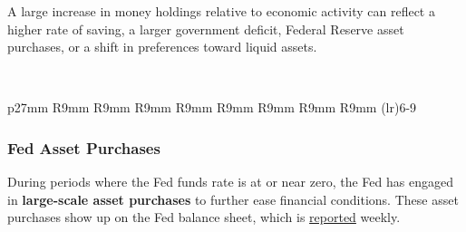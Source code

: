 \begin{minipage}{0.76\textwidth}
\small A large increase in money holdings relative to economic activity can reflect a higher rate of saving, a larger government deficit, Federal Reserve asset purchases, or a shift in preferences toward liquid assets.


\vspace{1mm}

\\
\vspace{4mm}

\vspace*{-3mm}

 \setlength{\tabcolsep}{3.5pt} \color{black!90}
{\renewcommand{\arraystretch}{1.65}
	\begin{tabular}{p{27mm} R{9mm} R{9mm} R{9mm} R{9mm} R{9mm} R{9mm} R{9mm} R{9mm}}
	\cmidrule(lr){6-9}\addlinespace[-0.9mm]
		 \hline
	\end{tabular}
}
\end{minipage}
\newpage
\subsubsection*{Fed Asset Purchases}
\begin{minipage}{0.76\textwidth}
  
\small During periods where the Fed funds rate is at or near zero, the Fed has engaged in \textbf{large-scale asset purchases} to further ease financial conditions. These asset purchases show up on the Fed balance sheet, which is \href{https://www.federalreserve.gov/releases/h41/current/default.htm}{reported} weekly. 




\end{minipage}

